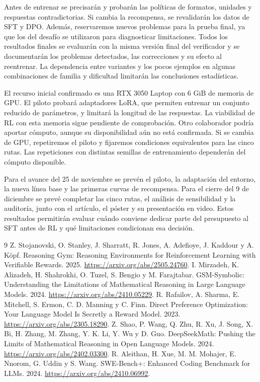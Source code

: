 Antes de entrenar se precisarán y probarán las políticas de formatos, unidades
y respuestas contradictorias. Si cambia la recompensa, se revalidarán los datos
de SFT y DPO. Además, reservaremos nuevos problemas para la prueba final, ya que
los del desafío se utilizaron para diagnosticar limitaciones. Todos los resultados
finales se evaluarán con la misma versión final del verificador y se documentarán
los problemas detectados, las correcciones y su efecto al reentrenar. La dependencia
entre variantes y los pocos ejemplos en algunas combinaciones de familia y
dificultad limitarán las conclusiones estadísticas.

El recurso inicial confirmado es una RTX 3050 Laptop con 6 GiB de memoria de GPU.
El piloto probará adaptadores LoRA, que permiten entrenar un conjunto reducido
de parámetros, y limitará la longitud de las respuestas. La viabilidad de RL
con esta memoria sigue pendiente de comprobación. Otro colaborador podría aportar
cómputo, aunque su disponibilidad aún no está confirmada. Si se cambia de GPU,
repetiremos el piloto y fijaremos condiciones equivalentes para las cinco rutas.
Las repeticiones con distintas semillas de entrenamiento dependerán del cómputo disponible.

Para el avance del 25 de noviembre se prevén el piloto, la adaptación del entorno,
la nueva línea base y las primeras curvas de recompensa. Para el cierre del
9 de diciembre se prevé completar las cinco rutas, el análisis de sensibilidad
y la auditoría, junto con el artículo, el póster y su presentación en video.
Estos resultados permitirán evaluar cuándo conviene dedicar parte del presupuesto
al SFT antes de RL y qué limitaciones condicionan esa decisión.

\clearpage
\begingroup\raggedright
\begin{thebibliography}{9}
 Z. Stojanovski, O. Stanley, J. Sharratt, R. Jones,
A. Adefioye, J. Kaddour y A. K\"opf. Reasoning Gym: Reasoning Environments
for Reinforcement Learning with Verifiable Rewards. 2025.
\url{https://arxiv.org/abs/2505.24760}.
 I. Mirzadeh, K. Alizadeh, H. Shahrokhi, O. Tuzel,
S. Bengio y M. Farajtabar. GSM-Symbolic: Understanding the Limitations of
Mathematical Reasoning in Large Language Models. 2024.
\url{https://arxiv.org/abs/2410.05229}.
 R. Rafailov, A. Sharma, E. Mitchell, S. Ermon,
C. D. Manning y C. Finn. Direct Preference Optimization: Your Language Model
Is Secretly a Reward Model. 2023. \url{https://arxiv.org/abs/2305.18290}.
 Z. Shao, P. Wang, Q. Zhu, R. Xu, J. Song, X. Bi,
H. Zhang, M. Zhang, Y. K. Li, Y. Wu y D. Guo. DeepSeekMath: Pushing the Limits
of Mathematical Reasoning in Open Language Models. 2024.
\url{https://arxiv.org/abs/2402.03300}.
 R. Aleithan, H. Xue, M. M. Mohajer, E. Nnorom,
G. Uddin y S. Wang. SWE-Bench+: Enhanced Coding Benchmark for LLMs. 2024.
\url{https://arxiv.org/abs/2410.06992}.
\end{thebibliography}
\endgroup
